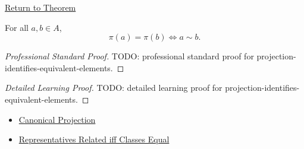 \newpage
{}
\label{prf:projection-identifies-equivalent-elements}

\begin{remark*}[Return]
\hyperref[prop:projection-identifies-equivalent-elements]{Return to Theorem}
\end{remark*}

\begin{proposition*}
For all $a,b\in A$,
\[
\pi(a)=\pi(b)\Longleftrightarrow a\sim b.
\]
\end{proposition*}

\begin{proof}[Professional Standard Proof]
\LRAProofBodyStart
TODO: professional standard proof for projection-identifies-equivalent-elements.
\end{proof}

\begin{proof}[Detailed Learning Proof]
\LRAProofBodyStart
TODO: detailed learning proof for projection-identifies-equivalent-elements.
\end{proof}

\begin{remark*}
\end{remark*}

\begin{dependencies}
\begin{itemize}
  \item \hyperref[def:canonical-projection]{Canonical Projection}
  \item \hyperref[prop:representatives-related-iff-classes-equal]{Representatives Related iff Classes Equal}
\end{itemize}
\end{dependencies}

\clearpage
